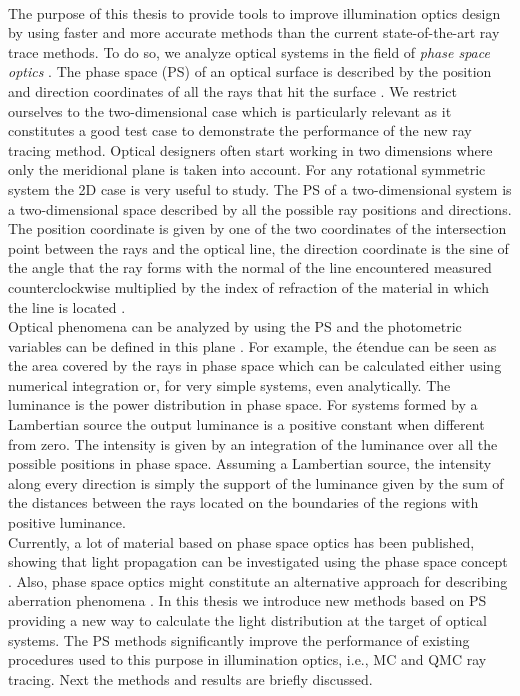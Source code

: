 \\ \indent The purpose of this thesis to provide tools to improve illumination optics design by using faster and more accurate methods than the current state-of-the-art ray trace methods.
To do so, we analyze optical systems in the field of \textit{phase space optics} \cite{torre2005linear}.
The phase space (PS) of an optical surface is described by the position and direction coordinates of all the rays that hit the surface \cite{testorf2009phase}. We restrict ourselves to the two-dimensional case which is particularly relevant as it constitutes a good test case to
demonstrate the performance of the new ray tracing method.
Optical designers often start working in two dimensions where only the
meridional plane is taken into account. For any rotational symmetric
system the 2D case is very useful to study. 
The PS of a two-dimensional system is a two-dimensional space described by all the possible ray positions and directions. The position coordinate is given by one of the two coordinates of the intersection point between the rays and the optical line, the direction coordinate is the sine of the angle that the ray forms with the normal of the line encountered measured counterclockwise multiplied by the index of refraction of the material in which the line is located \cite{wolf2004geometric}. 
\\ \indent Optical phenomena can be analyzed by using the PS and the photometric variables can be defined in this plane \cite{rausch2014illumination}.  
For example, the \'{e}tendue can be seen as the area covered by the rays in phase space which can be calculated either using numerical integration or, for very simple systems, even analytically. The luminance is the power distribution in phase space. For systems formed by a Lambertian source the output luminance is a positive constant when different from zero. The intensity is given by an integration of the luminance over all the possible positions in phase space. Assuming a Lambertian source, the intensity along every direction is simply the support of the luminance given by the sum of the distances between the rays located on the boundaries of the regions with positive luminance. 
\\ \indent Currently, a lot of material based on phase space optics has been published, showing that light propagation can be investigated using the phase space concept \cite{rausch2012phase,rausch2014phase, herkommer2012phase}. Also, phase space optics might constitute an alternative approach for describing aberration phenomena \cite{herkommer2013phase, babington2017freeform, wolf1993relativistic}. In this thesis we introduce new methods based on PS providing a new way to calculate the light distribution at the target of optical systems. The PS methods significantly improve the performance of existing procedures used to this purpose in illumination optics, i.e., MC and QMC ray tracing. 
Next the methods and results are briefly discussed. 
